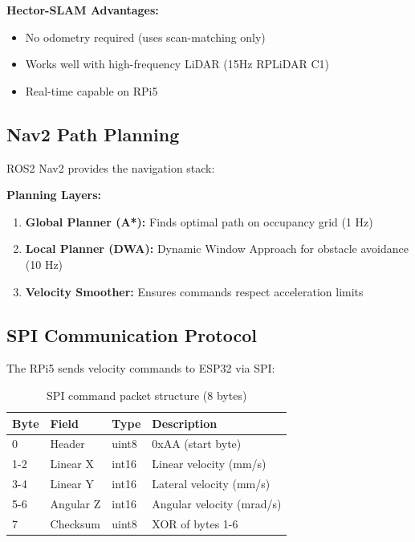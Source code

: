 \documentclass[11pt,letterpaper]{article}
\begin{document}
\textbf{Hector-SLAM Advantages:}
\begin{itemize}
    \item No odometry required (uses scan-matching only)
    \item Works well with high-frequency LiDAR (15Hz RPLiDAR C1)
    \item Real-time capable on RPi5
\end{itemize}

\subsection{Nav2 Path Planning}

ROS2 Nav2 provides the navigation stack:

\begin{center}
\end{center}

\textbf{Planning Layers:}
\begin{enumerate}
    \item \textbf{Global Planner (A*):} Finds optimal path on occupancy grid (1 Hz)
    \item \textbf{Local Planner (DWA):} Dynamic Window Approach for obstacle avoidance (10 Hz)
    \item \textbf{Velocity Smoother:} Ensures commands respect acceleration limits
\end{enumerate}

\subsection{SPI Communication Protocol}

The RPi5 sends velocity commands to ESP32 via SPI:

\begin{table}[H]
\centering
\begin{tabular}{@{}llll@{}}
\toprule
\textbf{Byte} & \textbf{Field} & \textbf{Type} & \textbf{Description} \\
\midrule
0 & Header & uint8 & 0xAA (start byte) \\
1-2 & Linear X & int16 & Linear velocity (mm/s) \\
3-4 & Linear Y & int16 & Lateral velocity (mm/s) \\
5-6 & Angular Z & int16 & Angular velocity (mrad/s) \\
7 & Checksum & uint8 & XOR of bytes 1-6 \\
\bottomrule
\end{tabular}
\caption{SPI command packet structure (8 bytes)}
\end{table}
\end{document}
